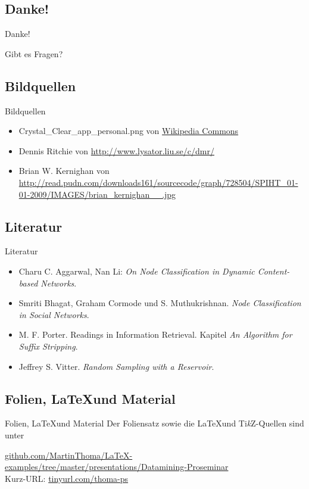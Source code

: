 \subsection{Danke!}
\begin{frame}{Danke!}
    \begin{center}
        \Huge
	    Gibt es Fragen?
    \end{center}
\end{frame}

\subsection{Bildquellen}
\begin{frame}{Bildquellen}
\begin{itemize}
	\item Crystal\_Clear\_app\_personal.png von \href{https://commons.wikimedia.org/wiki/File:Crystal_Clear_app_personal.png}{Wikipedia Commons}
	\item Dennis Ritchie von \url{http://www.lysator.liu.se/c/dmr/}
	\item Brian W. Kernighan von \url{http://read.pudn.com/downloads161/sourcecode/graph/728504/SPIHT_01-01-2009/IMAGES/brian_kernighan__.jpg}
\end{itemize}
\end{frame}

\subsection{Literatur}
\begin{frame}{Literatur}
\begin{itemize}
    \item Charu C. Aggarwal, Nan Li: \textit{On Node Classification in Dynamic Content-based Networks}.
    \item Smriti Bhagat, Graham Cormode und S. Muthukrishnan. \textit{Node Classification in Social Networks}.
    \item M. F. Porter. Readings in Information Retrieval. Kapitel \textit{An Algorithm for Suffix Stripping}.
    \item Jeffrey S. Vitter. \textit{Random Sampling with a Reservoir}.
\end{itemize}
\end{frame}

\subsection{Folien, \LaTeX und Material}
\begin{frame}{Folien, \LaTeX und Material}
Der Foliensatz sowie die \LaTeX und Ti\textit{k}Z-Quellen sind unter

\href{https://github.com/MartinThoma/LaTeX-examples/tree/master/presentations/Datamining-Proseminar}{github.com/MartinThoma/LaTeX-examples/tree/master/presentations/Datamining-Proseminar}
\\

Kurz-URL:
\href{http://tinyurl.com/thoma-ps}{tinyurl.com/thoma-ps}
\end{frame}
